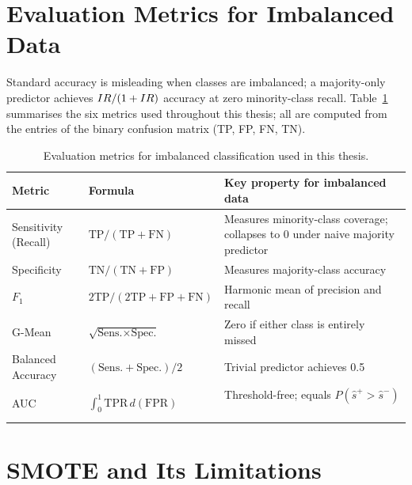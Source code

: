 \section{Evaluation Metrics for Imbalanced Data}
\label{sec:bg:metrics}

Standard accuracy is misleading when classes are imbalanced; a majority-only predictor achieves $IR/(1+IR)$ accuracy at zero minority-class recall.
Table~\ref{tab:bg:metrics} summarises the six metrics used throughout this thesis; all are computed from the entries of the binary confusion matrix (TP, FP, FN, TN).

\begin{table}[ht]
\centering
\caption{Evaluation metrics for imbalanced classification used in this thesis.}
\label{tab:bg:metrics}
\small
\begin{tabular}{llp{5.8cm}}
\toprule
\textbf{Metric} & \textbf{Formula} & \textbf{Key property for imbalanced data} \\
\midrule
Sensitivity (Recall) & $\mathrm{TP}/(\mathrm{TP}+\mathrm{FN})$ & Measures minority-class coverage; collapses to 0 under naive majority predictor \\
Specificity          & $\mathrm{TN}/(\mathrm{TN}+\mathrm{FP})$ & Measures majority-class accuracy \\
$F_1$                & $2\mathrm{TP}/(2\mathrm{TP}+\mathrm{FP}+\mathrm{FN})$ & Harmonic mean of precision and recall~\cite{sokolova2009systematic} \\
G-Mean               & $\sqrt{\text{Sens.} \times \text{Spec.}}$ & Zero if either class is entirely missed~\cite{kubat1997addressing} \\
Balanced Accuracy    & $(\text{Sens.}+\text{Spec.})/2$ & Trivial predictor achieves 0.5~\cite{brodersen2010balanced} \\
AUC                  & $\int_0^1 \text{TPR}\,d(\text{FPR})$ & Threshold-free; equals $P(\hat{s}^+>\hat{s}^-)$~\cite{fawcett2006introduction} \\
\bottomrule
\end{tabular}
\end{table}

\section{SMOTE and Its Limitations}
\label{sec:bg:smote}

